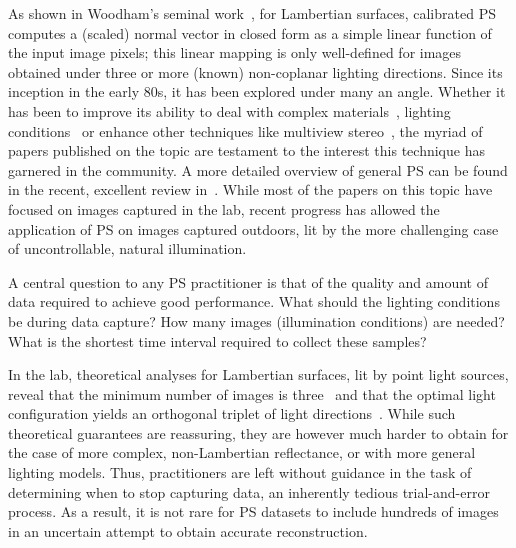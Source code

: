 As shown in Woodham's seminal work~\cite{woodham-opteng-80}, for Lambertian surfaces, calibrated PS computes a (scaled) normal vector in closed form as a simple linear function of the input image pixels; this linear mapping is only well-defined for images obtained under three or more (known) non-coplanar lighting directions. 
Since its inception in the early 80s, it has been explored under many an angle. Whether it has been to improve its ability to deal with complex materials~\cite{alldrin-cvpr-08}, lighting conditions~\cite{alldrin-cvpr-08,basri-ijcv-07,johnson-cvpr-11,oxholm-eccv-12} or enhance other techniques like multiview stereo~\cite{snavely-ijcv-08}, the myriad of papers published on the topic are testament to the interest this technique has garnered in the community. A more detailed overview of general PS can be found in the recent, excellent review in~\cite{shi-tpami-18}. While most of the papers on this topic have focused on images captured in the lab, recent progress has allowed the application of PS on images captured outdoors, lit by the more challenging case of uncontrollable, natural illumination. 

A central question to any PS practitioner is that of the quality and amount of data required to achieve good performance. What should the lighting conditions be during data capture? How many images (illumination conditions) are needed? What is the shortest time interval required to collect these samples? 

In the lab, theoretical analyses for Lambertian surfaces, lit by point light sources, reveal that the minimum number of images is three~\cite{woodham-opteng-80} and that the optimal light configuration yields an orthogonal triplet of light directions~\cite{drbohlav-iccv-05}. While such theoretical guarantees are reassuring, they are however much harder to obtain for the case of more complex, non-Lambertian reflectance, or with more general lighting models. Thus, practitioners are left without guidance in the task of determining when to stop capturing data, an inherently tedious trial-and-error process. As a result, it is not rare for PS datasets to include hundreds of images~\cite{alldrin-cvpr-08} in an uncertain attempt to obtain accurate reconstruction. 

